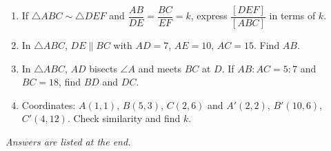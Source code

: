 \documentclass[11pt,a4paper]{article}
\begin{document}
\begin{enumerate}
  \item If $\triangle ABC\sim\triangle DEF$ and $\dfrac{AB}{DE}=\dfrac{BC}{EF}=k$, express $\dfrac{[DEF]}{[ABC]}$ in terms of $k$.
  \item In $\triangle ABC$, $DE\parallel BC$ with $AD=7$, $AE=10$, $AC=15$. Find $AB$.
  \item In $\triangle ABC$, $AD$ bisects $\angle A$ and meets $BC$ at $D$. If $AB:AC=5:7$ and $BC=18$, find $BD$ and $DC$.
  \item Coordinates: $A(1,1)$, $B(5,3)$, $C(2,6)$ and $A'(2,2)$, $B'(10,6)$, $C'(4,12)$. Check similarity and find $k$.
\end{enumerate}

\vspace{0.5em}
\noindent\textit{Answers are listed at the end.}

\newpage

\end{document}
